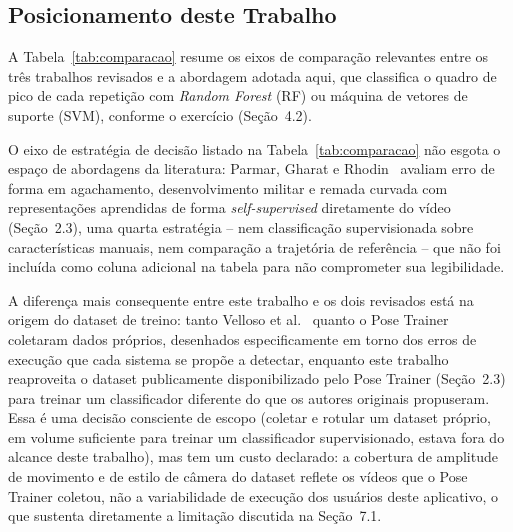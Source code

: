 \documentclass[12pt]{article}
\begin{document}
\subsection{Posicionamento deste Trabalho}

A Tabela~\ref{tab:comparacao} resume os eixos de comparação relevantes
entre os três trabalhos revisados e a abordagem adotada aqui, que classifica
o quadro de pico de cada repetição com \textit{Random Forest} (RF) ou
máquina de vetores de suporte (SVM), conforme o exercício (Seção~4.2).

O eixo de estratégia de decisão listado na Tabela~\ref{tab:comparacao} não
esgota o espaço de abordagens da literatura: Parmar, Gharat e
Rhodin~\cite{parmar2022workout} avaliam erro de forma em agachamento,
desenvolvimento militar e remada curvada com representações aprendidas de
forma \textit{self-supervised} diretamente do vídeo (Seção~2.3), uma
quarta estratégia -- nem classificação supervisionada sobre características
manuais, nem comparação a trajetória de referência -- que não foi incluída
como coluna adicional na tabela para não comprometer sua legibilidade.

A diferença mais consequente entre este trabalho e os dois revisados está
na origem do dataset de treino: tanto Velloso et
al.~\cite{velloso2013hars} quanto o Pose
Trainer~\cite{chen2020poseexercise} coletaram dados próprios, desenhados
especificamente em torno dos erros de execução que cada sistema se propõe
a detectar, enquanto este trabalho reaproveita o dataset publicamente
disponibilizado pelo Pose Trainer (Seção~2.3) para treinar um classificador
diferente do que os autores originais propuseram. Essa é uma decisão
consciente de escopo (coletar e rotular um dataset próprio, em volume
suficiente para treinar um classificador supervisionado, estava fora do
alcance deste trabalho), mas tem um custo declarado: a cobertura de
amplitude de movimento e de estilo de câmera do dataset reflete os vídeos
que o Pose Trainer coletou, não a variabilidade de execução dos usuários
deste aplicativo, o que sustenta diretamente a limitação discutida na
Seção~7.1.
\end{document}
